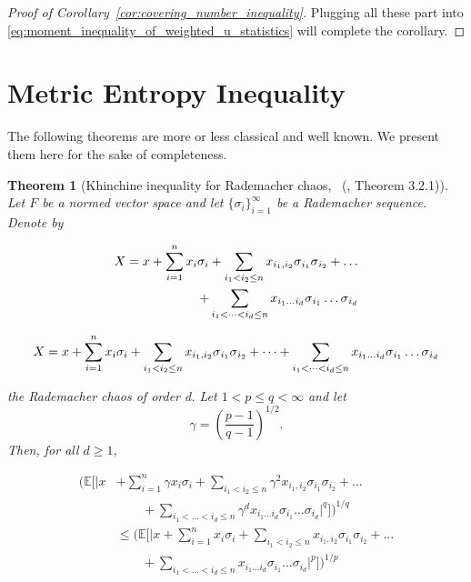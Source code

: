 \documentclass[letterpaper]{article} %
\def\DoubleColumn{}
\def\DoubleColumnEnd{}
\def\SingleColumn{}
\def\SingleColumnEnd{}
\newtheorem{theorem}{Theorem}
\newcommand{\E}{\mathbb{E}}
\newcommand{\rademacher}{\sigma}
\newcommand{\citett}[2]{\citeauthor{#2}\ (\citeyear{#2}, #1)}
\begin{document}
\begin{proof}[Proof of Corollary~\ref{cor:covering_number_inequality}]
Plugging all these part into \eqref{eq:moment_inequality_of_weighted_u_statistics} will complete the corollary.
\end{proof}

\section{Metric Entropy Inequality} %
\label{sub:metric_entropy_inequality}

The following theorems are more or less classical and well known. We present them here for the sake of completeness.

\begin{theorem}[Khinchine inequality for Rademacher chaos, {\citett{Theorem 3.2.1}{de2012decoupling}}]
    \label{th:kinchine_type_ineqaulity}
    Let $F$ be a normed vector space and let $\{\rademacher{}_i\}_{i=1}^\infty$ be a Rademacher sequence. Denote by
    \DoubleColumn
    \begin{align*}
        X=x+\sum_{i=1}^n x_i\rademacher_i+\sum_{i_1<i_2\le n}\linebreak x_{i_1,i_2}\rademacher{}_{i_1}\rademacher{}_{i_2}+\dots\\
        +\sum_{i_1<\dots<i_d\le n}x_{i_1\dots i_d}\rademacher{}_{i_1}\dots \rademacher{}_{i_d}        
    \end{align*}
    \DoubleColumnEnd
    \SingleColumn
    \begin{align*}
        X=x+\sum_{i=1}^n x_i\rademacher_i+\sum_{i_1<i_2\le n}\linebreak x_{i_1,i_2}\rademacher{}_{i_1}\rademacher{}_{i_2}+\dots+\sum_{i_1<\dots<i_d\le n}x_{i_1\dots i_d}\rademacher{}_{i_1}\dots \rademacher{}_{i_d}        
    \end{align*}
    \SingleColumnEnd
    the Rademacher chaos of order d. Let $1<p\le q<\infty$ and let
    \[\gamma=(\frac{p-1}{q-1})^{1/2}.\]
    Then, for all $d\ge 1$,
    \DoubleColumn
    \begin{align*}
        (\E[|x&+\sum_{i=1}^n \gamma x_i\rademacher_i+\sum_{i_1<i_2\le n}\gamma^2x_{i_1,i_2}\rademacher{}_{i_1}\rademacher{}_{i_2}+\dots\\
        &\qquad+\sum_{i_1<\dots<i_d\le n}\gamma^dx_{i_1\dots i_d}\rademacher{}_{i_1}\dots \rademacher{}_{i_d}|^q])^{1/q}\\
        &\le (\E[|x+\sum_{i=1}^n x_i\rademacher_i+\sum_{i_1<i_2\le n}x_{i_1,i_2}\rademacher{}_{i_1}\rademacher{}_{i_2}+\dots\\
        &\qquad+\sum_{i_1<\dots<i_d\le n}x_{i_1\dots i_d}\rademacher{}_{i_1}\dots \rademacher{}_{i_d}|^p])^{1/p}

\end{align*}
\end{theorem}
\end{document}
